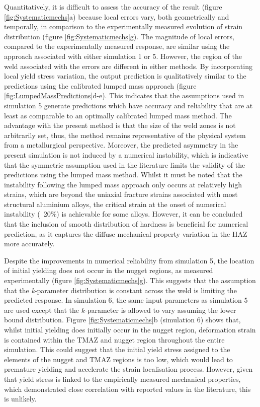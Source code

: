 Quantitatively, it is difficult to assess the accuracy of the result (figure \ref{fig:Systematicmechs}a) because local errors vary, both geometrically and temporally, in comparison to the experimentally measured evolution of strain distribution (figure \ref{fig:Systematicmechs}g). The magnitude of local errors, compared to the experimentally measured response, are similar using the approach associated with either simulation 1 or 5. However, the region of the weld associated with the errors are different in either methods. By incorporating local yield stress variation, the output prediction is qualitatively similar to the predictions using the calibrated lumped mass approach (figure \ref{fig:LumpedMassPredictions}d-e). This indicates that the assumptions used in simulation 5 generate predictions which have accuracy and reliability that are at least as comparable to an optimally calibrated lumped mass method. The advantage with the present method is that the size of the weld zones is not arbitrarily set, thus, the method remains representative of the physical system from a metallurgical perspective. Moreover, the predicted asymmetry in the present simulation is not induced by a numerical instability, which is indicative that the symmetric assumption used in the literature limits the validity of the predictions using the lumped mass method. Whilst it must be noted that the instability following the lumped mass approach only occurs at relatively high strains, which are beyond the uniaxial fracture strains associated with most structural aluminium alloys, the critical strain at the onset of numerical instability (~20\%) is achievable for some alloys. However, it can be concluded that the inclusion of smooth distribution of hardness is beneficial for numerical prediction, as it captures the diffuse mechanical property variation in the HAZ more accurately.

Despite the improvements in numerical reliability from simulation 5, the location of initial yielding does not occur in the nugget regions, as measured experimentally (figure \ref{fig:Systematicmechs}g). This suggests that the assumption that the \textit{k}-parameter distribution is constant across the weld is limiting the predicted response. In simulation 6, the same input parameters as simulation 5 are used except that the $k$-parameter is allowed to vary assuming the lower bound distribution. Figure \ref{fig:Systematicmechs}b (simulation 6) shows that, whilst initial yielding does initially occur in the nugget region, deformation strain is contained within the TMAZ and nugget region throughout the entire simulation. This could suggest that the initial yield stress assigned to the elements of the nugget and TMAZ regions is too low, which would lead to premature yielding and accelerate the strain localisation process. However, given that yield stress is linked to the empirically measured mechanical properties, which demonstrated close correlation with reported values in the literature, this is unlikely. 

